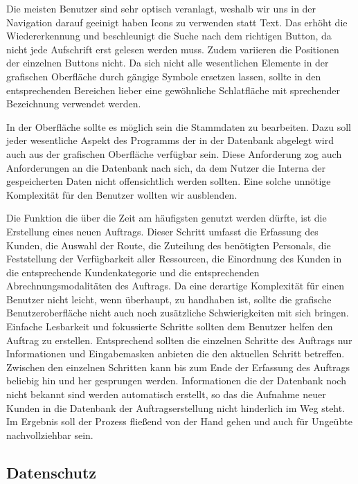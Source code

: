 \documentclass[12pt]{article}
\begin{document}
Die meisten Benutzer sind sehr optisch veranlagt, weshalb wir uns in der Navigation darauf geeinigt haben Icons zu verwenden statt Text. Das erhöht die Wiedererkennung und beschleunigt die Suche nach dem richtigen Button, da nicht jede Aufschrift erst gelesen werden muss. Zudem variieren die Positionen der einzelnen Buttons nicht. Da sich nicht alle wesentlichen Elemente in der grafischen Oberfläche durch gängige Symbole ersetzen lassen, sollte in den entsprechenden Bereichen lieber eine gewöhnliche Schlatfläche mit sprechender Bezeichnung verwendet werden.
\newline

In der Oberfläche sollte es möglich sein die Stammdaten zu bearbeiten. Dazu soll jeder wesentliche Aspekt des Programms der in der Datenbank abgelegt wird auch aus der grafischen Oberfläche verfügbar sein. Diese Anforderung zog auch Anforderungen an die Datenbank nach sich, da dem Nutzer die Interna der gespeicherten Daten nicht offensichtlich werden sollten. Eine solche unnötige Komplexität für den Benutzer wollten wir ausblenden.
\newline

Die Funktion die über die Zeit am häufigsten genutzt werden dürfte, ist die Erstellung eines neuen Auftrags. Dieser Schritt umfasst die Erfassung des Kunden, die Auswahl der Route, die Zuteilung des benötigten Personals, die Feststellung der Verfügbarkeit aller Ressourcen, die Einordnung des Kunden in die entsprechende Kundenkategorie und die entsprechenden Abrechnungsmodalitäten des Auftrags. Da eine derartige Komplexität für einen Benutzer nicht leicht, wenn überhaupt, zu handhaben ist, sollte die grafische Benutzeroberfläche nicht auch noch zusätzliche Schwierigkeiten mit sich bringen. Einfache Lesbarkeit und fokussierte Schritte sollten dem Benutzer helfen den Auftrag zu erstellen. Entsprechend sollten die einzelnen Schritte des Auftrags nur Informationen und Eingabemasken anbieten die den aktuellen Schritt betreffen. Zwischen den einzelnen Schritten kann bis zum Ende der Erfassung des Auftrags beliebig hin und her gesprungen werden. Informationen die der Datenbank noch nicht bekannt sind werden automatisch erstellt, so das die Aufnahme neuer Kunden in die Datenbank der Auftragserstellung nicht hinderlich im Weg steht. Im Ergebnis soll der Prozess fließend von der Hand gehen und auch für Ungeübte nachvollziehbar sein.

\subsection{Datenschutz}
\end{document}
